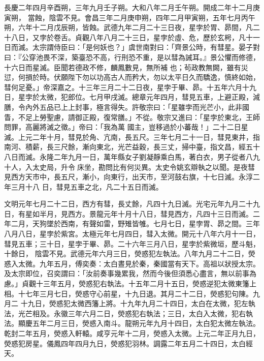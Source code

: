\begin{pinyinscope}
 長慶二年四月辛酉朔，三年九月壬子朔。大和八年二月壬午朔。開成二年十二月庚寅朔，
 當蝕，陰雲不見。會昌三年二月庚申朔，四年二月甲寅朔，五年七月丙午朔，六年十二月戊辰朔，皆蝕。武德九年二月二十三日夜，星孛於胃、昴間，凡二十八日，又孛於卷舌。貞觀八年八月二十三日，星孛於虛、危，歷於玄枵，凡十一日而滅。太宗謂侍臣曰：「是何妖也？」虞世南對曰：「齊景公時，有彗星。晏子對曰：『公穿池畏不深，築臺恐不高，行刑恐不重，是以彗為誡耳。』景公懼而修德，十六日而星滅。臣聞若德政不修，麟鳳數見，無所補
 也；茍政教無闕，雖有災愆，何損於時。伏願陛下勿以功高古人而矜大，勿以太平日久而驕逸，慎終如始，彗何足憂。」帝深嘉之。十三年三月二十二日夜，星孛于畢、昴。十五年六月十九日，星孛於太微，犯郎位。七月甲戌滅。總章元年四月，彗見五車，上避正殿，減膳，令內外五品已上上封事，極言得失。許敬宗曰：「星雖孛而光芒小，此非國眚，不足上勞聖慮，請御正殿，復常膳。」不從。敬宗又進曰：「星孛於東北，王師問罪，高麗將滅之徵。」帝曰：「我為萬
 國主，豈移過於小蕃哉！」二十二日星滅。上元二年十月，彗見於角、亢南，長五尺。三年七月二十一日，彗見東井，指南河、積薪，長三尺餘，漸向東北，光芒益穀，長三丈，掃中臺，指文昌，經五十八日而滅。永隆二年九月一日，萬年縣女子劉凝靜乘白馬，著白衣，男子從者八九十人，入太史局，升令床坐，勘問比有何災異。太史令姚玄辯執之以聞。是夜彗見西方天市中，長五尺，漸小，向東行，出天市，至河鼓右旗，十七日滅。永淳二年三月十八
 日，彗見五車之北，凡二十五日而滅。



 文明元年七月二十二日，西方有彗，長丈餘，凡四十九日滅。光宅元年九月二十九日，有星如半月，見西方。景龍元年十月十八日，彗見西方，凡四十三日而滅。二年二月，天狗墜於西南，有聲如雷，野雉皆雊。七月七日，星孛胃、昴之間。三年八月八日，星孛於紫宮。太極元年七月四日，彗入太微。開元十八年六月十一日，彗見五車；三十日，星孛于畢、昴。二十六年三月八日，星孛於紫微垣，歷斗魁，十餘日，
 陰雲不見。武德元年六月三日，熒惑犯左執法。八年九月二十二日，熒惑入太微。九年五月，傅奕奏：太白晝見於秦，秦國當有天下。高祖以狀授太宗。及太宗即位，召奕謂曰：「汝前奏事幾累我，然而今後但須悉心盡言，無以前事為慮。」貞觀十三年五月，熒惑犯右執法。十五年二月十五日，熒惑逆犯太微東籓上相。十七年三月七日，熒惑守心前星，十九日退。其月二十二日，熒惑犯句陳。九月二
 十九日，熒惑犯太微西籓上將。十九年九月二十四日，太白在太微，犯左執法，光芒相及。永徽三年六月二日，熒惑犯右執法；三日，太白入太微，犯右執法。顯慶五年二月三日，熒惑入南斗。龍朔元年九月十四日，太白犯太微左執法。乾封二年五月，熒惑入軒轅。咸亨元年十二月，熒惑入太微。上元二年正月九日，熒惑犯房星。儀鳳四年四月九日，熒惑犯羽林。調露二年五月二十四日，太白經天。




\end{pinyinscope}
